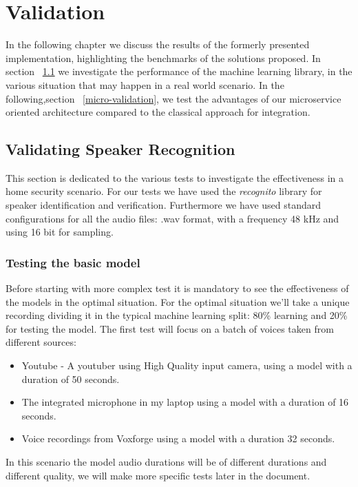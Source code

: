 \chapter{Validation}
\label{chap4}
In the following chapter we discuss the results of the formerly
presented implementation, highlighting the benchmarks of the solutions proposed.
In section ~\ref{speaker-validation} we investigate the performance of the machine learning
library, in the various situation that may happen in a real world scenario. In the following,section ~\ref{micro-validation},
we test the advantages of our microservice oriented architecture compared to the classical approach
for integration.

\section{Validating Speaker Recognition}
\label{speaker-validation}

This section is dedicated to the various tests to investigate
the effectiveness in a home security scenario. For our
tests we have used the \textit{recognito} library
for speaker identification and verification. Furthermore we have used standard configurations
for all the audio files: .wav format, with a frequency 48 kHz and using 16 bit for sampling.

\subsection{Testing the basic model}
\label{basic}

Before starting with more complex test it is mandatory to see the effectiveness
of the models in the optimal situation. For the optimal situation we'll take
a unique recording dividing it in the typical machine learning split: 80\% learning
and 20\% for testing the model.\newline \pagebreak
The first test will focus on a batch of voices taken from different sources:

\begin{itemize}
    \item Youtube -  A youtuber using High Quality input camera, using a model with a duration of 50 seconds.
    \item The integrated microphone in my laptop using a model with a duration of 16 seconds.
    \item Voice recordings from Voxforge using a model with a duration 32 seconds.
\end{itemize}
In this scenario the model audio durations will be of different durations and different
quality, we will make more specific tests later in the document.

